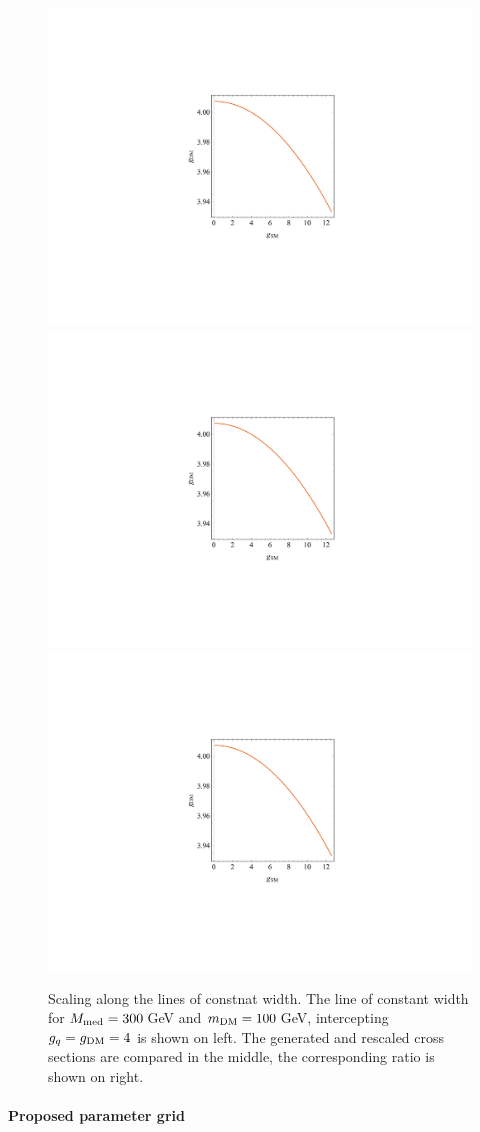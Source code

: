 \begin{figure}
\centering
\includegraphics[page=1, trim=310 200 310 200, clip, width=0.3\linewidth]{figures/monojet/rescalingexercise.pdf}
\includegraphics[page=2, trim=305 195 305 195, clip, width=0.3\linewidth]{figures/monojet/rescalingexercise.pdf}
\includegraphics[page=3, trim=300 190 300 190, clip, width=0.3\linewidth]{figures/monojet/rescalingexercise.pdf}
\caption{Scaling along the lines of constnat width. The line of constant width for $M_{\rm{med}}=300$\,GeV and $m_{\rm{DM}}=100$\,GeV, intercepting $g_q=g_{\rm{DM}}=4$ is shown on left. The generated and rescaled cross sections are compared in the middle, the corresponding ratio is shown on right.}
\label{fig:monojet_scaling_constwidth}
\end{figure}


\paragraph{Proposed parameter grid}

